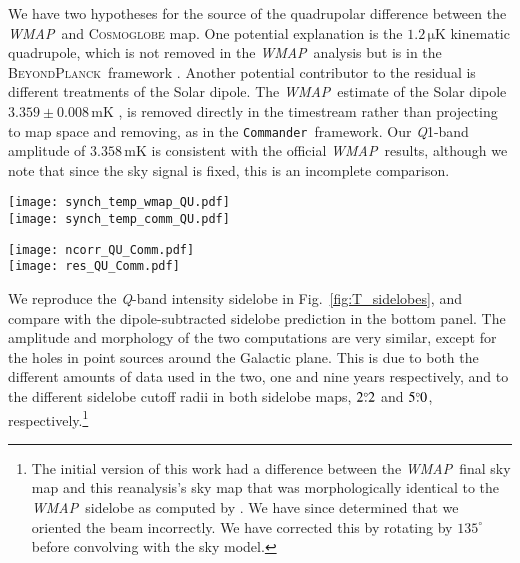 \documentclass[twocolumn]{aa}
\def\WMAP{\emph{WMAP}}
\def\commander{\texttt{Commander}}
\newcommand{\BP}{\textsc{BeyondPlanck}}
\newcommand{\K}[0]{\textit K}
\newcommand{\Q}[0]{\textit Q}
\begin{document}
We have two hypotheses for the source of the quadrupolar difference
between the \WMAP\ and \textsc{Cosmoglobe} map. One potential explanation is
the $1.2\,\mathrm{\mu K}$ kinematic quadrupole, which is not removed in the
\WMAP\ analysis \citep{jarosik2007,larson2014} but is in the \BP\ framework
\citep{bp01}. Another potential contributor to the residual is different
treatments of the Solar dipole. The \WMAP\ estimate of the Solar dipole
$3.359\pm0.008\,\mathrm{mK}$ \citep{hinshaw2009}, is removed directly in the
timestream rather than projecting to map space and removing, as in the
\commander\ framework. Our \Q1-band amplitude of $3.358\,\mathrm{mK}$ is
consistent with the official \WMAP\ results, although we note that since the
sky signal is fixed, this is an incomplete comparison.


\begin{figure*}
  \centering
	\texttt{[image: synch\_temp\_wmap\_QU.pdf]}\\
	\texttt{[image: synch\_temp\_comm\_QU.pdf]}
	\caption{Difference maps between \WMAP\ \K-band and \WMAP\
          (\emph{top row}) and \commander\ (\emph{bottom row})
          \Q1-band, designed to reduce polarized synchrotron
          emission. The \K-band map has been scaled by a factor of
          0.17 to account for the different central frequencies
          of the two frequency channels. }
	\label{fig:K_minus_Q}
\end{figure*}        

\begin{figure*}
  \centering
	\texttt{[image: ncorr\_QU\_Comm.pdf]}\\
	\texttt{[image: res\_QU\_Comm.pdf]}
	\caption{(\emph{Top row:}) \commander\ correlated noise sample
        for the \Q1 channel in polarization smoothed with $5\deg$ FWHM. (\emph{Bottom row:}) Corresponding TOD residual sample, also smoothed with a $5\deg$ FWHM beam. }
	\label{fig:P_gof}
\end{figure*}

We reproduce the \Q-band intensity sidelobe in Fig.~\ref{fig:T_sidelobes}, and
compare with the dipole-subtracted sidelobe prediction in the bottom panel. The
amplitude and morphology of the two computations are very similar, except for
the holes in point sources around the Galactic plane. This is due to both the
different amounts of data used in the two, one and nine years respectively, and
to the different sidelobe cutoff radii in both sidelobe maps, $2\overset{\circ}{.}2$ and
$5\overset{\circ}{.}0$, respectively.\footnote{ The initial version of this work had a
difference between the \WMAP\ final sky map and this reanalysis's sky map that
was morphologically identical to the \WMAP\ sidelobe as computed by
\citet{barnes2003}. We have since determined that we oriented the beam incorrectly.
We have corrected this by rotating by $135^\circ$ before convolving with the sky
model.  }
\end{document}
